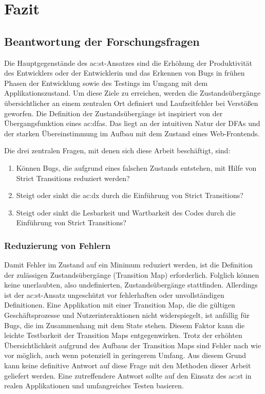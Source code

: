 \chapter{Fazit} \label{ch:fazit}

\section{Beantwortung der Forschungsfragen}

Die Hauptgegenstände des \acrlong{ac:st}-Ansatzes sind die Erhöhung der Produktivität des Entwicklers oder der Entwicklerin und das Erkennen von Bugs in frühen Phasen der Entwicklung sowie des Testings im Umgang mit dem Applikationszustand. Um diese Ziele zu erreichen, werden die Zustandsübergänge übersichtlicher an einem zentralen Ort definiert und Laufzeitfehler bei Verstößen geworfen. Die Definition der Zustandsübergänge ist inspiriert von der Übergangsfunktion eines \acrshort{ac:dfa}s. Das liegt an der intuitiven Natur der DFAs und der starken Übereinstimmung im Aufbau mit dem Zustand eines Web-Frontends.

Die drei zentralen Fragen, mit denen sich diese Arbeit beschäftigt, sind:

\begin{enumerate}
  \item Können Bugs, die aufgrund eines falschen Zustands entstehen, mit Hilfe von Strict Transitions reduziert werden?
  \item Steigt oder sinkt die \acrshort{ac:dx} durch die Einführung von Strict Transitions?
  \item Steigt oder sinkt die Lesbarkeit und Wartbarkeit des Codes durch die Einführung von Strict Transitions?
\end{enumerate}

\subsection{Reduzierung von Fehlern}

Damit Fehler im Zustand auf ein Minimum reduziert werden, ist die Definition der zulässigen Zustandsübergänge (Transition Map) erforderlich. Folglich können keine unerlaubten, also undefinierten, Zustandsübergänge stattfinden. Allerdings ist der \acrshort{ac:st}-Ansatz ungeschützt vor fehlerhaften oder unvollständigen Definitionen. Eine Applikation mit einer Transition Map, die die gültigen Geschäftsprozesse und Nutzerinteraktionen nicht widerspiegelt, ist anfällig für Bugs, die im Zusammenhang mit dem State stehen. Diesem Faktor kann die leichte Testbarkeit der Transition Maps entgegenwirken. Trotz der erhöhten Übersichtlichkeit aufgrund des Aufbaus der Transition Maps sind Fehler nach wie vor möglich, auch wenn potenziell in geringerem Umfang. Aus diesem Grund kann keine definitive Antwort auf diese Frage mit den Methoden dieser Arbeit geliefert werden. Eine zutreffendere Antwort sollte auf den Einsatz des \acrshort{ac:st} in realen Applikationen und umfangreiches Testen basieren.

